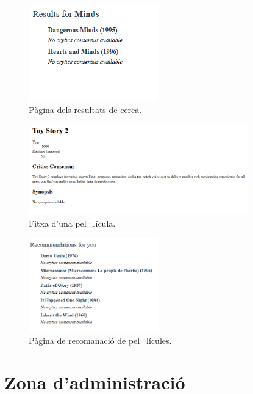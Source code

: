 \begin{figure}[h]
  \caption{Pàgina dels resultats de cerca.}
  \label{figure-search-results}
  \centering
    \includegraphics[width=0.5\textwidth]{figs/resultats-busqueda.png}
\end{figure}

\begin{figure}[h]
  \caption{Fitxa d'una pel·lícula.}
  \label{figure-film}
  \centering
    \includegraphics[width=0.85\textwidth]{figs/film.png}
\end{figure}

\begin{figure}[h]
  \caption{Pàgina de recomanació de pel·lícules.}
  \label{figure-recommendations}
  \centering
    \includegraphics[width=0.5\textwidth]{figs/recommendation.png}
\end{figure}

\section{Zona d'administració}

